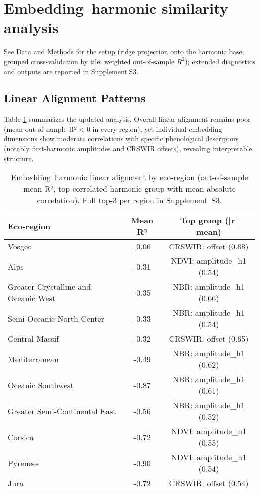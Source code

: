 \documentclass[utf8]{FrontiersinHarvard}
\begin{document}
\section{Embedding–harmonic similarity analysis}

See Data and Methods for the setup (ridge projection onto the harmonic base; grouped cross-validation by tile; weighted out-of-sample $R^2$); extended diagnostics and outputs are reported in Supplement S3.

\subsection{Linear Alignment Patterns}

Table \ref{tab:similarity_ecoregion} summarizes the updated analysis. Overall linear alignment remains poor (mean out-of-sample R² < 0 in every region), yet individual embedding dimensions show moderate correlations with specific phenological descriptors (notably first-harmonic amplitudes and CRSWIR offsets), revealing interpretable structure.

\begin{table}[H]
\centering
\begin{tabular}{lcc}
\hline
\textbf{Eco-region} & \textbf{Mean R²} & \textbf{Top group (|r| mean)} \\ \hline
Vosges & -0.06 & CRSWIR: offset (0.68) \\
Alps & -0.31 & NDVI: amplitude\_h1 (0.54) \\
Greater Crystalline and Oceanic West & -0.35 & NBR: amplitude\_h1 (0.66) \\
Semi-Oceanic North Center & -0.33 & NBR: amplitude\_h1 (0.54) \\
Central Massif & -0.32 & CRSWIR: offset (0.65) \\
Mediterranean & -0.49 & NBR: amplitude\_h1 (0.62) \\
Oceanic Southwest & -0.87 & NBR: amplitude\_h1 (0.61) \\
Greater Semi-Continental East & -0.56 & NBR: amplitude\_h1 (0.52) \\
Corsica & -0.72 & NDVI: amplitude\_h1 (0.55) \\
Pyrenees & -0.90 & NDVI: amplitude\_h1 (0.54) \\
Jura & -0.72 & CRSWIR: offset (0.54) \\ \hline
\end{tabular}
\caption{Embedding–harmonic linear alignment by eco-region (out-of-sample mean R², top correlated harmonic group with mean absolute correlation). Full top-3 per region in Supplement~S3.}
\label{tab:similarity_ecoregion}
\end{table}
\end{document}
